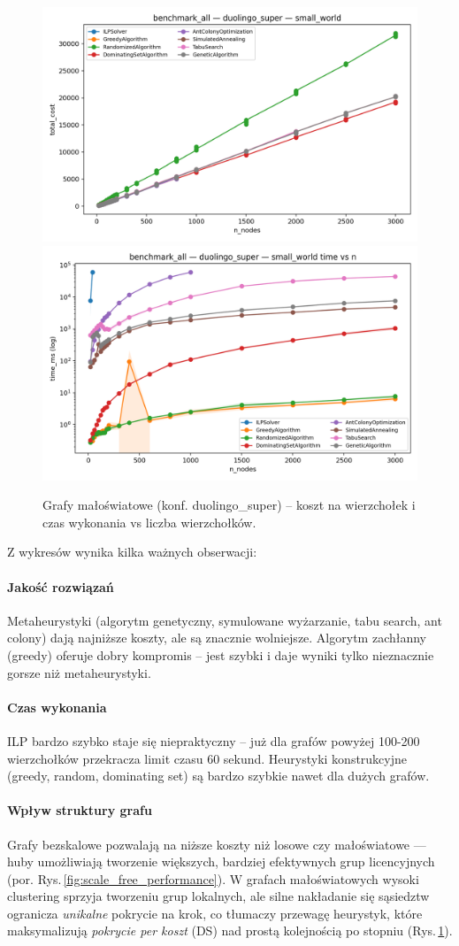 \begin{figure}[H]
  \centering
  \includegraphics[width=0.48\linewidth]{assets/figures/ba_small_world_duo_cost_vs_n.png}
  \includegraphics[width=0.48\linewidth]{assets/figures/ba_small_world_duo_time_vs_n.png}
  \caption{Grafy małoświatowe (konf. duolingo\_super) -- koszt na wierzchołek i czas wykonania vs liczba wierzchołków.}
  \label{fig:small_world_performance}
\end{figure}

Z wykresów wynika kilka ważnych obserwacji:

\paragraph{Jakość rozwiązań}
Metaheurystyki (algorytm genetyczny, symulowane wyżarzanie, tabu search, ant colony) dają najniższe koszty, ale są znacznie wolniejsze. Algorytm zachłanny (greedy) oferuje dobry kompromis -- jest szybki i daje wyniki tylko nieznacznie gorsze niż metaheurystyki.

\paragraph{Czas wykonania}
ILP bardzo szybko staje się niepraktyczny -- już dla grafów powyżej 100-200 wierzchołków przekracza limit czasu 60 sekund. Heurystyki konstrukcyjne (greedy, random, dominating set) są bardzo szybkie nawet dla dużych grafów.

\paragraph{Wpływ struktury grafu}
Grafy bezskalowe pozwalają na niższe koszty niż losowe czy małoświatowe — huby umożliwiają tworzenie większych, bardziej efektywnych grup licencyjnych (por. Rys.\,\ref{fig:scale_free_performance}). W grafach małoświatowych wysoki clustering sprzyja tworzeniu grup lokalnych, ale silne nakładanie się sąsiedztw ogranicza \emph{unikalne} pokrycie na krok, co tłumaczy przewagę heurystyk, które maksymalizują \emph{pokrycie per koszt} (DS) nad prostą kolejnością po stopniu (Rys.\,\ref{fig:small_world_performance}).


